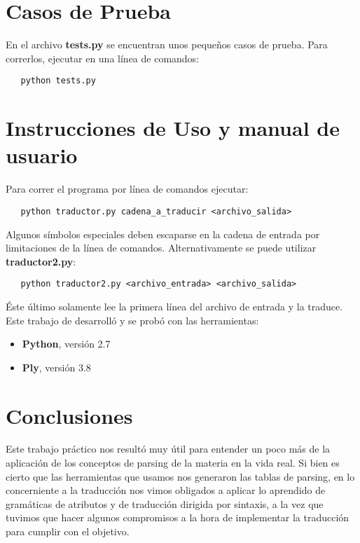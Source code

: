 \newpage

\section{Casos de Prueba}

\indent En el archivo \textbf{tests.py} se encuentran unos pequeños casos de prueba.
\indent Para correrlos, ejecutar en una línea de comandos:
\begin{verbatim}
   python tests.py
\end{verbatim}

\section{Instrucciones de Uso y manual de usuario}

\indent \indent Para correr el programa por línea de comandos ejecutar:\\
\begin{verbatim}
   python traductor.py cadena_a_traducir <archivo_salida>
\end{verbatim}
\indent Algunos símbolos especiales deben escaparse en la cadena de entrada por limitaciones de la línea de comandos. 
\indent Alternativamente se puede utilizar \textbf{traductor2.py}:
\begin{verbatim}
   python traductor2.py <archivo_entrada> <archivo_salida>
\end{verbatim}
\indent Éste último solamente lee la primera línea del archivo de entrada y la traduce.\\

\indent Este trabajo de desarrolló y se probó con las herramientas:
\begin{itemize}
\item \textbf{Python}, versión 2.7
\item \textbf{Ply}, versión 3.8
\end{itemize}

\section{Conclusiones}

\indent Este trabajo práctico nos resultó muy útil para entender un poco más de la aplicación de los conceptos de parsing de la materia en la vida real. Si bien es cierto que las herramientas que usamos nos generaron las tablas de parsing, en lo concerniente a la traducción nos vimos obligados a aplicar lo aprendido de gramáticas de atributos y de traducción dirigida por sintaxis, a la vez que tuvimos que hacer algunos compromisos a la hora de implementar la traducción para cumplir con el objetivo.\\


